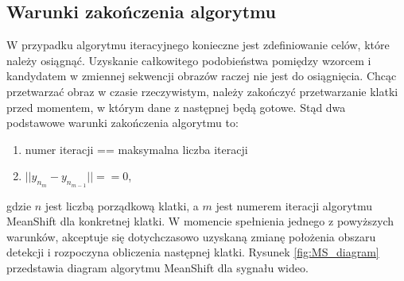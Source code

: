 \subsection{Warunki zakończenia algorytmu}
W przypadku algorytmu iteracyjnego konieczne jest zdefiniowanie celów, które należy osiągnąć. Uzyskanie całkowitego podobieństwa pomiędzy wzorcem i kandydatem w zmiennej sekwencji obrazów raczej nie jest do osiągnięcia. Chcąc przetwarzać obraz w czasie rzeczywistym, należy zakończyć przetwarzanie klatki przed momentem, w którym dane z następnej będą gotowe. Stąd dwa podstawowe warunki zakończenia algorytmu to:
\begin{enumerate}
	\item numer iteracji == maksymalna liczba iteracji
	\item $||y_{n_m}-y_{n_{m-1}}||==0$,
\end{enumerate} 
gdzie $n$ jest liczbą porządkową klatki, a $m$ jest numerem iteracji algorytmu MeanShift dla konkretnej klatki.
W momencie spełnienia jednego z powyższych warunków, akceptuje się dotychczasowo uzyskaną zmianę położenia obszaru detekcji i rozpoczyna obliczenia następnej klatki. \newline Rysunek \ref{fig:MS_diagram} przedstawia diagram algorytmu MeanShift dla sygnału wideo.
